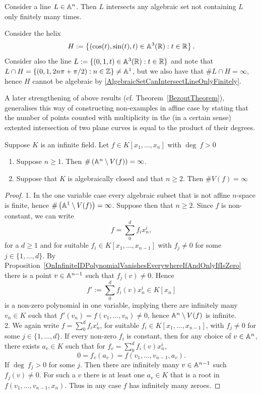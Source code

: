 \begin{corollary}\label{AlgebraicSetCanIntersectLineOnlyFinitely}
     Consider a line $L\in \mathbb{A}^n$. Then $L$ intersects any algebraic set not containing $L$ only finitely many times. 
\end{corollary}
\begin{example}
    Consider the helix 
        $$H := \left\{(\cos(t),\sin(t),t)\in \mathbb{A}^3(\mathbb{R}) : t\in \mathbb{R} \right\}.$$
    Consider also the line $L:=\{ (0,1,t)\in \mathbb{A}^3(\mathbb{R}) : t \in \mathbb{R}\}$ and note that $L \cap H = \{ (0,1, 2n\pi + \pi/2) : n\in \mathbb{Z}\}\neq \mathbb{A}^1$, but we also have that $\# L\cap H = \infty$, hence $H$ cannot be algebraic by \ref{AlgebraicSetCanIntersectLineOnlyFinitely}.
\end{example}
A later strengthening of above results (cf. Theorem~\ref{BezoutTheorem}), generalises this way of constructing non-examples in affine case by stating that the number of points counted with multiplicity in the (in a certain sense) extented intersection of two plane curves is equal to the product of their degrees.  
\begin{proposition}\label{AlgebraicSetsOverInfiniteFieldsAndAlgClosedFields}
    Suppose $K$ is an infinite field. Let $f\in K[x_1,\dots,x_n]$ with $\deg \ f>0$
    \begin{enumerate}
        \item Suppose $n\geq 1$. Then $\#\left(\mathbb{A}^n\setminus V(f)\right) = \infty$.
        \item Suppose that $K$ is algebraically closed and that $n\geq 2$. Then $\#V(f) = \infty$
    \end{enumerate}
\end{proposition}
\begin{proof}
    1. In the one variable case every algebraic subset that is not affine $n$-space is finite, hence $\#\left(\mathbb{A}^1\setminus V(f) \right) = \infty$. Suppose then that $n\geq 2$. Since $f$ is non-constant, we can write
    $$f = \sum_0^d f_ix_n^{i},$$
    for a $d\geq 1$ and for suitable $f_i\in K[x_1,\dots,x_{n-1}]$ with $f_j \neq0$ for some $j\in \{1,\dots,d\}$. By Proposition~\ref{OnInfiniteIDPolynomialVanishesEverywhereIfAndOnlyIfIsZero} there is a point $v\in \mathbb{A}^{n-1}$ such that $f_j(v)\neq 0$. Hence 
    $$f' := \sum_0^d f_i(v)x_n^i\in K[x_n]$$
    is a non-zero polynomial in one variable, implying there are infinitely many $v_n\in K$ such that $f'(v_n)=f(v_1,\dots,v_n)\neq 0$, hence $\mathbb{A}^n\setminus V(f)$ is infinite.\\
    2. We again write $f=\sum_0^d f_ix_n^i$, for suitable $f_i\in K[x_1,\dots,x_{n-1}]$, with $f_j\neq 0$ for some $j\in\{1,\dots,d\}$. If every non-zero $f_i$ is constant, then for any choice of $v\in \mathbb{A}^n$, there exists $a_v\in K$ such that for $f_v = \sum_0^d f_i(v)x_n^i$, 
    $$0 = f_v(a_v) = f(v_1,\dots,v_{n-1},a_v).$$
    If $\deg \ f_j >0$ for some $j$. Then there are infinitely many $v\in \mathbb{A}^{n-1}$ such $f_j(v)\neq 0$. For such a $v$ there is at least one $a_v\in K$ that is a root in $f(v_1,\dots,v_{n-1},x_n)$. Thus in any case $f$ has infinitely many zeroes.
\end{proof}
